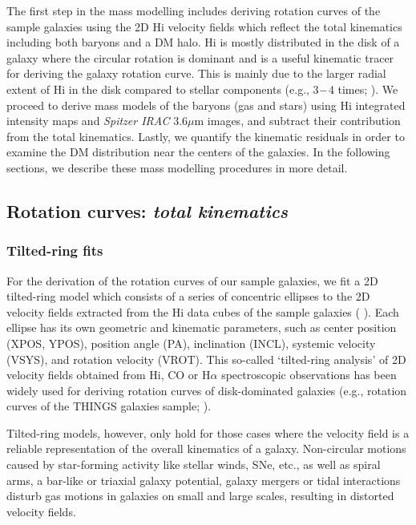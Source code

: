 \documentclass[natbib209]{emulateapj}
\begin{document}
The first step in the mass modelling includes deriving rotation curves of the sample
galaxies using the 2D H{\sc i} velocity fields which reflect the total kinematics
including both baryons and a DM halo. 
H{\sc i} is mostly distributed in the disk of a galaxy where the circular rotation is
dominant and is a useful kinematic tracer for deriving the galaxy rotation curve.
This is mainly due to the larger radial extent of H{\sc i} in the disk
compared to stellar components (e.g., 3$\--$4 times; \citeauthor{Sofue_2001}
\citeyear{Sofue_2001}). We proceed to derive  mass models of the
baryons (gas and stars) using H{\sc i} integrated intensity maps and {\it Spitzer IRAC}
3.6$\mu$m images, and subtract their contribution from the total kinematics. Lastly, we
quantify the kinematic residuals in order to examine the DM 
distribution near the centers of the galaxies. In the following sections, we
describe these mass modelling procedures in more detail.


\subsection{Rotation curves: {\it total kinematics}} \label{ROTATION_CURVE}

\subsubsection{Tilted-ring fits} \label{TR_FITS}

For the derivation of the rotation curves of our sample galaxies, we fit
a 2D tilted-ring model which consists of a series of concentric ellipses to the
2D velocity fields extracted from the H{\sc i} data cubes of the sample
galaxies (\citeauthor{Rogstad_1974} \citeyear{Rogstad_1974}). Each ellipse has
its own geometric and kinematic parameters, such as center position (XPOS,
YPOS), position angle (PA), inclination (INCL), systemic velocity (VSYS), and
rotation velocity (VROT). This so-called `tilted-ring analysis' of 2D velocity
fields obtained from H{\sc i}, CO or H$\alpha$ spectroscopic observations has been widely
used for deriving rotation curves of disk-dominated galaxies (e.g., rotation
curves of the THINGS galaxies sample; \citeauthor{deBlok_2008}
\citeyear{deBlok_2008}).

Tilted-ring models, however, only hold for those cases where the velocity
field is a reliable representation of the overall kinematics of a galaxy.
Non-circular motions caused by star-forming activity like
stellar winds, SNe, etc., as well as spiral arms, a bar-like or triaxial galaxy
potential, galaxy mergers or tidal interactions disturb gas motions in galaxies
on small and large scales, resulting in distorted velocity fields.
\end{document}
